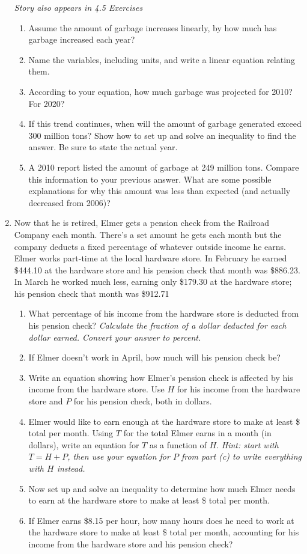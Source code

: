 \begin{enumerate}
\hfill \emph{Story also appears in 4.5 Exercises}
\begin{enumerate}
\item Assume the amount of garbage increases linearly, by how much has garbage increased each year? 
\item Name the variables, including units, and write a linear equation relating them.
\item According to your equation, how much garbage was projected for 2010?  For 2020?
\item If this trend continues, when will the amount of garbage generated exceed 300 million tons?   Show how to set up and solve an inequality to find the answer.  Be sure to state the actual year.
\item A 2010 report listed the amount of garbage at 249 million tons.  Compare this information to your previous answer.  What are some possible explanations for why this amount was less than expected (and actually decreased from 2006)?
\end{enumerate} 

\item Now that he is retired, Elmer gets a pension check from the Railroad Company each month.  There's a set amount he gets each month but the company deducts a fixed percentage of whatever outside income he earns.  Elmer works part-time at the local hardware store.  In February he earned \$444.10 at the hardware store and his pension check that month was \$886.23.  In March he worked much less,  earning only \$179.30 at the hardware store; his pension check that month was \$912.71
\begin{enumerate}
\item What percentage of his income from the hardware store is deducted from his pension check?  \emph{Calculate the fraction of a dollar deducted for each dollar earned.  Convert your answer to percent.}
\item If Elmer doesn't work in April, how much will his pension check be?  
\item Write an equation showing how Elmer's pension check is affected by his income from the hardware store.  Use $H$ for his income from the hardware store and $P$ for his pension check, both in dollars.  
\item Elmer would like to earn enough at the hardware store to make at least \$ total per month.  Using $T$ for the total Elmer earns in a month (in dollars), write an equation for $T$ as a function of $H$.  \emph{Hint:  start with $T=H+P$, then use your equation for $P$ from part (c) to write everything with $H$ instead.}
\item Now set up and solve an inequality to determine how much Elmer needs to earn at the hardware store to make at least \$ total per month.
\item If Elmer earns \$8.15 per hour, how many hours does he need to work at the hardware store to make at least  \$ total per month, accounting for his income from the hardware store and his pension check?
\end{enumerate}
 

\end{enumerate}
